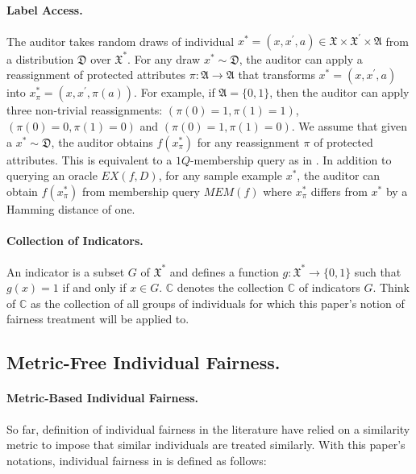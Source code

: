 \documentclass{article}
\begin{document}
\paragraph{Label Access.}
The auditor takes random draws of individual $x^{*}=(x, x^{'}, a)\in \mathfrak{X} \times \mathfrak{X}^{'} \times \mathfrak{A} $ from a distribution $\mathfrak{D}$ over $\mathfrak{X}^{*}$. For any draw $x^{*}\sim \mathfrak{D}$,  the auditor can apply a reassignment of protected attributes $\pi: \mathfrak{A} \rightarrow \mathfrak{A}$ that transforms $x^{*}= (x, x^{'}, a)$ into $x^{*}_{\pi}=(x, x^{'}, \pi(a))$. For example, if $\mathfrak{A}=\{0,1\}$, then the auditor can apply three non-trivial reassignments: $(\pi(0)=1, \pi(1)=1)$, $(\pi(0)=0, \pi(1)=0)$ and $(\pi(0)=1, \pi(1)=0)$. We assume that given a $x^{*}\sim \mathfrak{D}$, the auditor obtains $f(x^{*}_{\pi})$ for any reassignment $\pi$ of protected attributes. This is equivalent to a $1Q$-membership query as in \cite{awasthi2013learning}. In addition to querying an oracle $EX(f, D)$, for any sample  example $x^{*}$, the auditor can obtain $f(x^{*}_{\pi})$ from membership query $MEM(f)$ where $x_{\pi}^{*}$ differs from $x^{*}$  by a Hamming distance of one.  


\paragraph{Collection of Indicators.}
An indicator is a subset $G$ of $\mathfrak{X}^{*}$ and defines a function $g: \mathfrak{X}^{*} \rightarrow \{0, 1\}$ such that $g(x)=1$ if and only if $x\in G$. $\mathbb{C}$ denotes the collection $\mathbb{C}$ of indicators $G$. Think of $\mathbb{C}$ as the collection of all groups of individuals for which this paper's notion of fairness treatment will be applied to. 

 

\subsection{Metric-Free Individual Fairness.}

\paragraph{Metric-Based Individual Fairness.}
So far, definition of individual fairness in the literature have relied on a similarity metric to impose that similar individuals are treated similarly. With this paper's notations, individual fairness in \cite{dwork2012fairness} is defined as follows:
\end{document}
